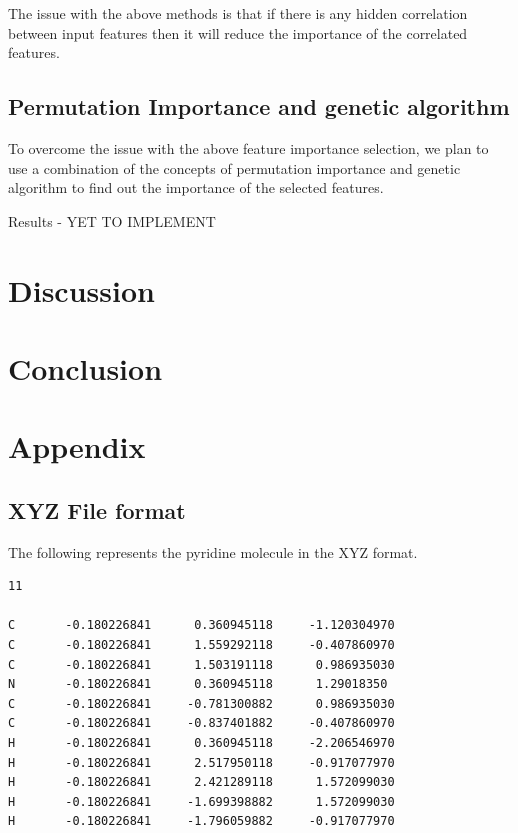 \documentclass[11pt]{article}
\begin{document}
The issue with the above methods is that if there is any hidden correlation between input features then it will reduce the importance of the correlated features.

\subsection{Permutation Importance and genetic algorithm}
To overcome the issue with the above feature importance selection, we plan to use a combination of the concepts of permutation importance and genetic algorithm to find out the importance of the selected features.

Results - YET TO IMPLEMENT

\section{Discussion}


\section{Conclusion}




\section{Appendix}
\subsection{XYZ File format}
\label{XYZFileexampleref}
The following represents the pyridine molecule in the XYZ format.
\begin{verbatim}
11

C       -0.180226841      0.360945118     -1.120304970
C       -0.180226841      1.559292118     -0.407860970
C       -0.180226841      1.503191118      0.986935030
N       -0.180226841      0.360945118      1.29018350
C       -0.180226841     -0.781300882      0.986935030
C       -0.180226841     -0.837401882     -0.407860970
H       -0.180226841      0.360945118     -2.206546970
H       -0.180226841      2.517950118     -0.917077970
H       -0.180226841      2.421289118      1.572099030
H       -0.180226841     -1.699398882      1.572099030
H       -0.180226841     -1.796059882     -0.917077970
\end{verbatim}
\end{document}
